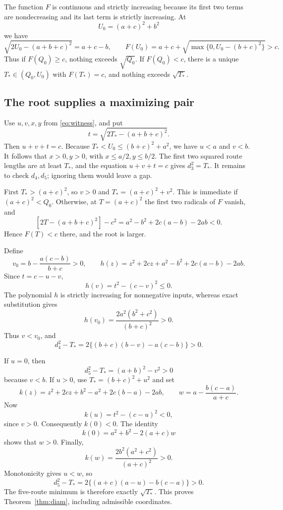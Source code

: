 \documentclass[11pt]{article}
\theoremstyle{definition}
\newcommand{\spq}[1]{\sqrt{\max\{0,#1\}}}
\newcommand{\sqzero}{Q_0}
\begin{document}
The function \(F\) is continuous and strictly increasing because its
first two terms are nondecreasing and its last term is strictly
increasing. At
\[
U_0=(a+c)^2+b^2
\]
we have
\[
\sqrt{2U_0-(a+b+c)^2}=a+c-b,\qquad
F(U_0)=a+c+\spq{U_0-(b+c)^2}>c.
\]
Thus if \(F(\sqzero)\ge c\), nothing exceeds \(\sqrt{\sqzero}\).
If \(F(\sqzero)<c\), there is a unique
\(T_*\in(\sqzero,U_0)\) with \(F(T_*)=c\), and nothing exceeds
\(\sqrt{T_*}\).

\subsection{The root supplies a maximizing pair}

Use \(u,v,x,y\) from \eqref{eq:witness}, and put
\[
t=\sqrt{2T_*-(a+b+c)^2}.
\]
Then \(u+v+t=c\).
Because \(T_*<U_0\le(b+c)^2+a^2\), we have \(u<a\) and \(v<b\).
It follows that \(x>0,y>0\), with \(x\le a/2,y\le b/2\).
The first two squared route lengths are at least \(T_*\),
and the equation \(u+v+t=c\) gives \(d_3^2=T_*\).
It remains to check \(d_4,d_5\); ignoring them would leave a gap.

First \(T_*>(a+c)^2\), so \(v>0\) and
\(T_*=(a+c)^2+v^2\). This is immediate if \((a+c)^2<\sqzero\).
Otherwise, at \(T=(a+c)^2\) the first two radicals of \(F\)
vanish, and
\[
[2T-(a+b+c)^2]-c^2
=a^2-b^2+2c(a-b)-2ab<0.
\]
Hence \(F(T)<c\) there, and the root is larger.

Define
\[
v_0=b-\frac{a(c-b)}{b+c}>0,\qquad
h(z)=z^2+2cz+a^2-b^2+2c(a-b)-2ab.
\]
Since \(t=c-u-v\),
\[
h(v)=t^2-(c-v)^2\le0.
\]
The polynomial \(h\) is strictly increasing for nonnegative inputs,
whereas exact substitution gives
\[
h(v_0)=\frac{2a^2(b^2+c^2)}{(b+c)^2}>0.
\]
Thus \(v<v_0\), and
\begin{equation}\label{eq:slack4}
d_4^2-T_*
=2\{(b+c)(b-v)-a(c-b)\}>0.
\end{equation}

If \(u=0\), then
\[
d_5^2-T_*=(a+b)^2-v^2>0
\]
because \(v<b\).
If \(u>0\), use \(T_*=(b+c)^2+u^2\) and set
\[
k(z)=z^2+2cz+b^2-a^2+2c(b-a)-2ab,\qquad
w=a-\frac{b(c-a)}{a+c}.
\]
Now
\[
k(u)=t^2-(c-u)^2<0,
\]
since \(v>0\). Consequently \(k(0)<0\). The identity
\[
k(0)=a^2+b^2-2(a+c)w
\]
shows that \(w>0\). Finally,
\[
k(w)=\frac{2b^2(a^2+c^2)}{(a+c)^2}>0.
\]
Monotonicity gives \(u<w\), so
\begin{equation}\label{eq:slack5}
d_5^2-T_*
=2\{(a+c)(a-u)-b(c-a)\}>0.
\end{equation}
The five-route minimum is therefore exactly \(\sqrt{T_*}\).
This proves Theorem~\ref{thm:diam}, including admissible coordinates.
\end{document}
